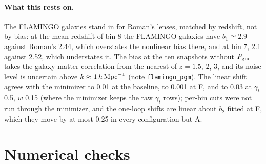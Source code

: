 \documentclass[11pt]{article}
\newcommand{\hMpc}{\,h\,{\rm Mpc}^{-1}}
\begin{document}
\paragraph{What this rests on.}
The FLAMINGO galaxies stand in for Roman's lenses, matched by redshift, not
by bias: at the mean redshift of bin 8 the FLAMINGO galaxies have
$b_1 \simeq 2.9$ against Roman's 2.44, which overstates the nonlinear bias
there, and at bin 7, 2.1 against 2.52, which understates it. The bias at
the ten snapshots without $P_{\rm gm}$ takes the galaxy-matter correlation
from the nearest of $z = 1.5$, 2, 3, and its noise level is uncertain above
$k \approx 1\hMpc$ (note \texttt{flamingo\_pgm}). The linear shift agrees
with the minimizer to 0.01 at the baseline, to 0.001 at F, and to 0.03 at
$\gamma_t$ 0.5, $w$ 0.15 (where the minimizer keeps the raw $\gamma_t$
rows); per-bin cuts were not run through the minimizer, and the one-loop
shifts are linear about $b_2$ fitted at F, which they move by at most 0.25
in every configuration but A.

\clearpage
\appendix

\section{Numerical checks}
\label{app:checks}
\end{document}

